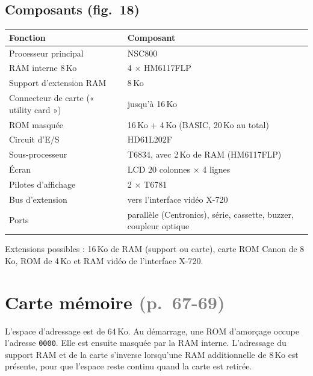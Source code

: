 \documentclass[a4paper,10pt]{article}
\newcommand{\hex}[1]{\texttt{#1}}
\newcommand{\pg}[1]{\texorpdfstring{\textcolor{gray}{\small(p.~#1)}}{}}
\begin{document}
\subsection{Composants (fig.~18)}
\begin{center}\small
\begin{tabular}{@{}ll@{}}
\toprule
Fonction & Composant \\
\midrule
Processeur principal & NSC800 \\
RAM interne 8\,Ko & 4 $\times$ HM6117FLP \\
Support d'extension RAM & 8\,Ko \\
Connecteur de carte (« utility card ») & jusqu'à 16\,Ko \\
ROM masquée & 16\,Ko + 4\,Ko (BASIC, 20\,Ko au total) \\
Circuit d'E/S & HD61L202F \\
Sous-processeur & T6834, avec 2\,Ko de RAM (HM6117FLP) \\
Écran & LCD 20 colonnes $\times$ 4 lignes \\
Pilotes d'affichage & 2 $\times$ T6781 \\
Bus d'extension & vers l'interface vidéo X-720 \\
Ports & parallèle (Centronics), série, cassette, buzzer, coupleur optique \\
\bottomrule
\end{tabular}
\end{center}

Extensions possibles : 16\,Ko de RAM (support ou carte), carte ROM Canon
de 8\,Ko, ROM de 4\,Ko et RAM vidéo de l'interface X-720.

\section{Carte mémoire \pg{67-69}}

L'espace d'adressage est de 64\,Ko. Au démarrage, une ROM d'amorçage occupe
l'adresse \hex{0000}. Elle est ensuite masquée par la RAM interne.
L'adressage du support RAM et de la carte s'inverse lorsqu'une RAM
additionnelle de 8\,Ko est présente, pour que l'espace reste continu quand la
carte est retirée.
\end{document}
